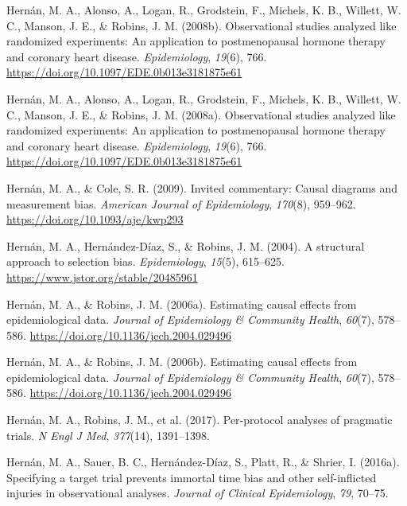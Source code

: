 \documentclass[
  single column]{article}
\newlength{\cslhangindent}
\newenvironment{CSLReferences}[2] %
 {\begin{list}{}{%
  \setlength{\itemindent}{0pt}
  \setlength{\leftmargin}{0pt}
  \setlength{\parsep}{0pt}
  \ifodd #1
   \setlength{\leftmargin}{\cslhangindent}
   \setlength{\itemindent}{-1\cslhangindent}
  \fi
  \setlength{\itemsep}{#2\baselineskip}}}
 {\end{list}}
\begin{document}
\begin{CSLReferences}{1}{0}
Hernán, M. A., Alonso, A., Logan, R., Grodstein, F., Michels, K. B.,
Willett, W. C., Manson, J. E., \& Robins, J. M. (2008b). Observational
studies analyzed like randomized experiments: An application to
postmenopausal hormone therapy and coronary heart disease.
\emph{Epidemiology}, \emph{19}(6), 766.
\url{https://doi.org/10.1097/EDE.0b013e3181875e61}

Hernán, M. A., Alonso, A., Logan, R., Grodstein, F., Michels, K. B.,
Willett, W. C., Manson, J. E., \& Robins, J. M. (2008a). Observational
studies analyzed like randomized experiments: An application to
postmenopausal hormone therapy and coronary heart disease.
\emph{Epidemiology}, \emph{19}(6), 766.
\url{https://doi.org/10.1097/EDE.0b013e3181875e61}

Hernán, M. A., \& Cole, S. R. (2009). Invited commentary: Causal
diagrams and measurement bias. \emph{American Journal of Epidemiology},
\emph{170}(8), 959--962. \url{https://doi.org/10.1093/aje/kwp293}

Hernán, M. A., Hernández-Díaz, S., \& Robins, J. M. (2004). A structural
approach to selection bias. \emph{Epidemiology}, \emph{15}(5), 615--625.
\url{https://www.jstor.org/stable/20485961}

Hernán, M. A., \& Robins, J. M. (2006a). Estimating causal effects from
epidemiological data. \emph{Journal of Epidemiology \& Community
Health}, \emph{60}(7), 578--586.
\url{https://doi.org/10.1136/jech.2004.029496}

Hernán, M. A., \& Robins, J. M. (2006b). Estimating causal effects from
epidemiological data. \emph{Journal of Epidemiology \& Community
Health}, \emph{60}(7), 578--586.
\url{https://doi.org/10.1136/jech.2004.029496}

Hernán, M. A., Robins, J. M., et al. (2017). Per-protocol analyses of
pragmatic trials. \emph{N Engl J Med}, \emph{377}(14), 1391--1398.

Hernán, M. A., Sauer, B. C., Hernández-Díaz, S., Platt, R., \& Shrier,
I. (2016a). Specifying a target trial prevents immortal time bias and
other self-inflicted injuries in observational analyses. \emph{Journal
of Clinical Epidemiology}, \emph{79}, 70--75.


\end{CSLReferences}
\end{document}
